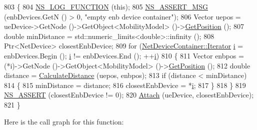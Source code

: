 \begin{DoxyCode}
803 \{
804   \hyperlink{log-macros-disabled_8h_a90b90d5bad1f39cb1b64923ea94c0761}{NS\_LOG\_FUNCTION} (\textcolor{keyword}{this});
805   \hyperlink{assert_8h_aff5ece9066c74e681e74999856f08539}{NS\_ASSERT\_MSG} (enbDevices.GetN () > 0, \textcolor{stringliteral}{"empty enb device container"});
806   Vector uepos = ueDevice->GetNode ()->GetObject<MobilityModel> ()->\hyperlink{lena-cqi-threshold_8cc_acebf763e1a0478cec225f9547941ae54}{GetPosition} ();
807   \textcolor{keywordtype}{double} minDistance = std::numeric\_limits<double>::infinity ();
808   Ptr<NetDevice> closestEnbDevice;
809   \textcolor{keywordflow}{for} (\hyperlink{classns3_1_1NetDeviceContainer_a45709bb572f975569ed985fa89b132f8}{NetDeviceContainer::Iterator} \hyperlink{bernuolliDistribution_8m_a6f6ccfcf58b31cb6412107d9d5281426}{i} = enbDevices.Begin (); 
      \hyperlink{bernuolliDistribution_8m_a6f6ccfcf58b31cb6412107d9d5281426}{i} != enbDevices.End (); ++\hyperlink{bernuolliDistribution_8m_a6f6ccfcf58b31cb6412107d9d5281426}{i})
810     \{
811       Vector enbpos = (*i)->GetNode ()->GetObject<MobilityModel> ()->\hyperlink{lena-cqi-threshold_8cc_acebf763e1a0478cec225f9547941ae54}{GetPosition} ();
812       \textcolor{keywordtype}{double} distance = \hyperlink{namespacens3_aaae60adf695e280c4882ced6041d1628}{CalculateDistance} (uepos, enbpos);
813       \textcolor{keywordflow}{if} (distance < minDistance)
814         \{
815           minDistance = distance;
816           closestEnbDevice = *\hyperlink{bernuolliDistribution_8m_a6f6ccfcf58b31cb6412107d9d5281426}{i};
817         \}
818     \}
819   \hyperlink{assert_8h_a6dccdb0de9b252f60088ce281c49d052}{NS\_ASSERT} (closestEnbDevice != 0);
820   \hyperlink{classns3_1_1LteHelper_a9466743f826aa2652a87907b7f0a1c87}{Attach} (ueDevice, closestEnbDevice);
821 \}
\end{DoxyCode}


Here is the call graph for this function\+:


